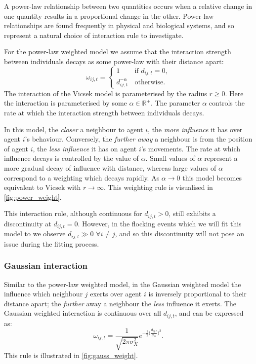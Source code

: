 A power-law relationship between two quantities occurs when a relative
change in one quantity results in a proportional change in the other.
Power-law relationships are found frequently in physical and biological
systems, and so represent a natural choice of interaction rule to investigate.

For the power-law weighted model we assume that the interaction strength
between individuals decays as some power-law with their distance
apart:
\begin{equation}
  \label{eq:power_law_interaction}
  \omega_{ij,t} =
  \begin{cases}
    1                  & \, \text{if } d_{ij,t} = 0, \\
	d_{ij,t}^{-\alpha} & \, \text{otherwise}.
  \end{cases}
\end{equation}
The interaction of the Vicsek model is parameterised by the radius $r \geq 0$.
Here the interaction is parameterised by some $\alpha\in\mathbb{R}^+$. The
parameter $\alpha$ controls the rate at which the interaction strength between
individuals decays. 

In this model, the \emph{closer} a neighbour to agent $i$, the \emph{more
influence} it has over agent $i$'s behaviour. Conversely, the \emph{further
away} a neighbour is from the position of agent $i$, the \emph{less influence}
it has on agent $i$'s movements. The rate at which influence decays is
controlled by the value of $\alpha$. Small values of $\alpha$ represent a more
gradual decay of influence with distance, whereas large values of $\alpha$
correspond to a weighting which decays rapidly. As $\alpha \rightarrow 0$ this
model becomes equivalent to Vicsek with $r \rightarrow \infty$. This weighting
rule is visualised in \cref{fig:power_weight}.

This interaction rule, although continuous for $d_{ij,t} > 0$, still exhibits a
discontinuity at $d_{ij,t}=0$. However, in the flocking events which we will
fit this model to we observe $d_{ij,t}\gg0$ $\forall i \neq j$, and so this
discontinuity will not pose an issue during the fitting process.

\subsubsection{Gaussian interaction}

Similar to the power-law weighted model, in the Gaussian weighted model the
influence which neighbour $j$ exerts over agent $i$ is inversely proportional
to their distance apart; the \emph{further} away a neighbour the \emph{less}
influence it exerts. The Gaussian weighted interaction is continuous over all
$d_{ij,t}$, and can be expressed as:
\begin{equation}
  \label{eq:gaussian_interaction}
  \omega_{ij,t} =
	\frac{1}{\sqrt{2\pi\sigma_X^2}}
	e^{-\frac{1}{2}\big(\frac{d_{ij,t}}{\sigma_X}\big)^2}.
\end{equation}
This rule is illustrated in \cref{fig:gauss_weight}.

